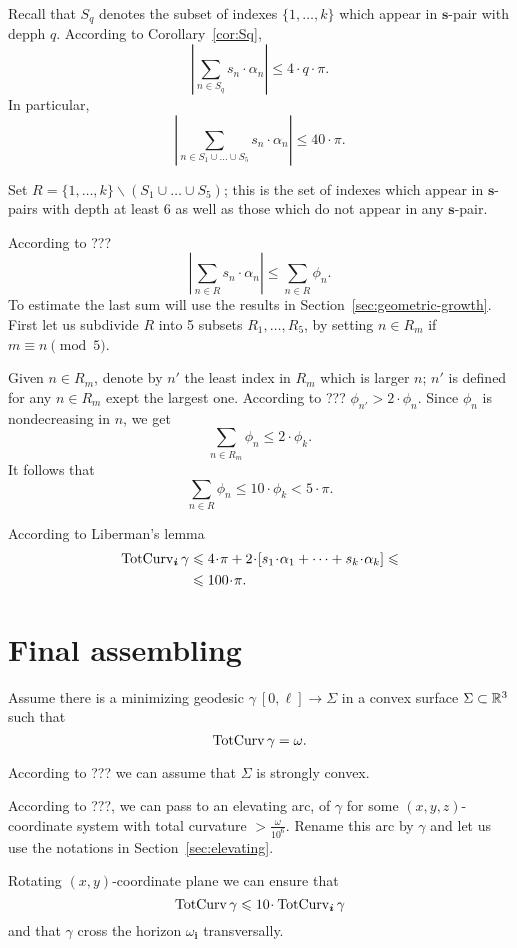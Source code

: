 \documentclass[a4paper,10pt]{amsart}
\begin{document}
Recall that $S_q$ denotes the subset of indexes $\{1,\dots,k\}$
which appear in $\bm{s}$-pair with depph $q$.
According to Corollary~\ref{cor:Sq},
\[\left|\sum_{n\in S_q}s_n\cdot\alpha_n\right|\le 4\cdot q\cdot \pi.\]
In particular,
\[\left|\sum_{n\in S_1\cup\dots\cup S_5}
s_n\cdot\alpha_n\right|
\le 
40\cdot\pi.\]

Set $R=\{1,\dots,k\}\backslash (S_1\cup\dots\cup S_5)$;
this is the set of indexes which appear in $\bm{s}$-pairs with depth at least $6$ 
as well as those which do not appear in any $\bm{s}$-pair.

According to ???
\[\left|\sum_{n\in R}
s_n\cdot\alpha_n\right|\le \sum_{n\in R}\phi_n.\] 
To estimate the last sum will use the results in Section~\ref{sec:geometric-growth}.
First let us subdivide $R$ into 5 subsets $R_1,\dots,R_5$,
by setting 
$n\in R_m$ if $m\equiv n\pmod 5$.

Given $n\in R_m$, denote by $n'$ the least index in $R_m$ which is larger $n$;
$n'$ is defined for any $n\in R_m$ exept the largest one.
According to ??? $\phi_{n'}>2\cdot \phi_n$.
Since $\phi_n$ is nondecreasing in $n$,
we get 
\[\sum_{n\in R_m}\phi_n\le 2\cdot\phi_k.\]
It follows that 
\[\sum_{n\in R}\phi_n\le 10\cdot\phi_k< 5\cdot\pi.\]

According to Liberman's lemma
\begin{align*}
\tc_{\bm{i}}\gamma
&\le 
4\cdot\pi
+
2\cdot [s_1\cdot\alpha_1+\dots+s_k\cdot\alpha_k]\le 
\\
&\le 100\cdot \pi.
\end{align*}
\qeds



\section{Final assembling}


Assume there is a minimizing geodesic $\gamma\:[0,\ell]\to \Sigma$ in a convex surface $\Sigma\subset \mathbb{R}^3$ such that
\[\mathop{\rm TotCurv}\nolimits\gamma=\omega.\]

According to ??? we can assume that $\Sigma$ is strongly convex.

According to ???, we can pass to an elevating arc, of $\gamma$ for some $(x,y,z)$-coordinate system with total curvature $>\tfrac{\omega}{10^6}$.
Rename this arc by $\gamma$ and let us use the notations in Section~\ref{sec:elevating}.

Rotating $(x,y)$-coordinate plane we can ensure that
\[\tc\gamma\le 10\cdot\tc_{\bm{i}}\gamma\]
and that $\gamma$ cross the horizon $\omega_{\bm{i}}$ transversally.
\end{document}
